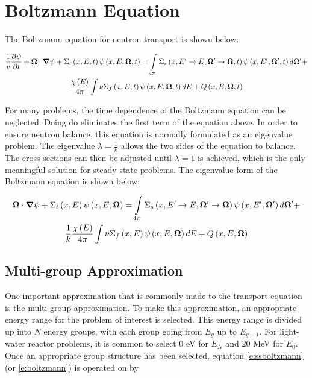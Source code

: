 \section{Boltzmann Equation}

The Boltzmann equation for neutron transport is shown below: 

\begin{gather}\label{e:boltzmann}
\frac{1}{v} \frac{\partial \psi}{\partial t} + \bm \Omega \cdot \bm \nabla \psi + \Sigma_t\left(x,E,t\right)\psi\left(x,E,\bm \Omega,t\right) = \intop_{4\pi} \Sigma_s\left(x,E' \rightarrow E, \bm \Omega' \rightarrow \bm \Omega, t\right) \psi\left(x,E',\bm \Omega',t\right) d\bm \Omega' + \nonumber\\
\frac{\chi\left(E\right)}{4\pi} \intop \nu \Sigma_f\left(x,E,t\right) \psi\left(x,E,\bm \Omega,t\right) dE + Q\left(x,E,\bm \Omega,t\right)
\end{gather}

For many problems, the time dependence of the Boltzmann equation can be neglected.  Doing do eliminates the first term of the equation above.  In order to ensure neutron balance, this equation is normally formulated as an eigenvalue problem.  The eigenvalue $\lambda = \frac{1}{k}$ allows the two sides of the equation to balance.  The cross-sections can then be adjusted until $\lambda = 1$ is achieved, which is the only meaningful solution for steady-state problems.  The eigenvalue form of the Boltzmann equation is shown below:

\begin{gather}\label{e:ssboltzmann}
\bm \Omega \cdot \bm \nabla \psi + \Sigma_t\left(x,E\right)\psi\left(x,E,\bm \Omega\right) = \intop_{4\pi} \Sigma_s\left(x,E' \rightarrow E, \bm \Omega' \rightarrow \bm \Omega\right) \psi\left(x,E',\bm \Omega'\right) d\bm \Omega' + \nonumber\\
\frac{1}{k}\frac{\chi\left(E\right)}{4\pi} \intop \nu \Sigma_f\left(x,E\right) \psi\left(x,E,\bm \Omega\right) dE + Q\left(x,E,\bm \Omega\right)
\end{gather}

\subsection{Multi-group Approximation}

One important approximation that is commonly made to the transport equation is the multi-group approximation.  To make this approximation, an appropriate energy range for the problem of interest is selected.  This energy range is divided up into $N$ energy groups, with each group going from $E_g$ up to $E_{g-1}$.  For light-water reactor problems, it is common to select 0 eV for $E_N$ and 20 MeV for $E_0$.  Once an appropriate group structure has been selected, equation \ref{e:ssboltzmann} (or \ref{e:boltzmann}) is operated on by 

